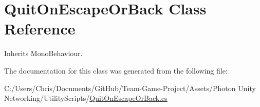 \hypertarget{class_quit_on_escape_or_back}{}\section{Quit\+On\+Escape\+Or\+Back Class Reference}
\label{class_quit_on_escape_or_back}


Inherits Mono\+Behaviour.



The documentation for this class was generated from the following file\+:\begin{DoxyCompactItemize}
\item 
C\+:/\+Users/\+Chris/\+Documents/\+Git\+Hub/\+Team-\/\+Game-\/\+Project/\+Assets/\+Photon Unity Networking/\+Utility\+Scripts/\hyperlink{_quit_on_escape_or_back_8cs}{Quit\+On\+Escape\+Or\+Back.\+cs}\end{DoxyCompactItemize}
